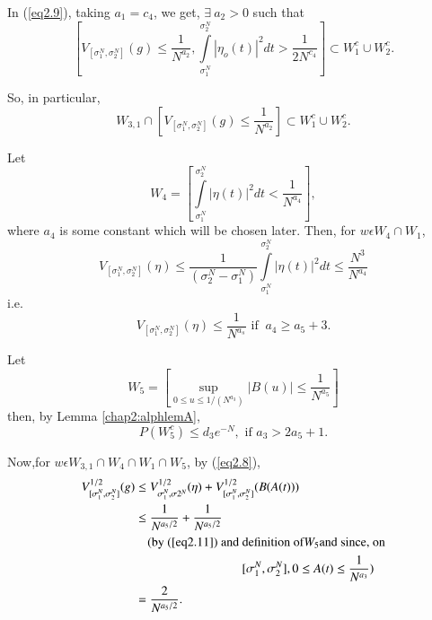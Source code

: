 In (\ref{eq2.9}), taking $a_1 = c_4$, we get, $\exists~ a_2  > 0$ such that  
$$
\left[V_{[\sigma_{1}^{N}, \sigma_{2}^{N}]} (g) \leq \frac{1}{N^{a_{2}}},
  \int\limits_{\sigma_{1}^{N}}^{\sigma_{2}^{N}} | \eta_o (t) |^2 dt >
  \frac{1}{2N^{c_{4}}}\right] \subset W_1^c  \cup W_2 ^c. 
$$

So, in particular,
\begin{equation*}
  W_{3, 1} \cap  \left[V _{[\sigma_{1}^{N}, \sigma_{2}^{N}]} (g) \leq
    \frac{1}{N^{a_{2}}}\right] \subset W_1^c \cup
  W_2^c. \tag{2.10}\label{eq2.10}  
\end{equation*}

Let
$$
 W_4 = \left[ \int\limits_{\sigma_{1}^{N}}^{\sigma_{2}^{N}} | \eta (t) |^2
   dt < \frac{1}{N^{a_{4}}} \right], 
$$
where $a_4$ is some  constant which will be chosen later. Then, for $w
\epsilon  W_4 \cap W_1$, 
$$
  V_{[\sigma_{1}^{N},\sigma_{2}^{N}]}(\eta) \leq
  \frac{1}{\left(\sigma_{2}^{N} -
    \sigma_{1}^{N}\right)} \int\limits_{\sigma_{1}^{N}}^{\sigma_{2}^{N}}|
  \eta (t) |^2 dt \leq \frac{N^3}{N^{a_{4}}} 
$$
i.e.
\begin{equation*}
 V_{[\sigma_{1}^{N},\sigma_{2}^{N}]}( \eta ) \leq \frac{1}{N^{a_{s}}}
 \text{ if }~ a_4 \geq a_5 + 3. \tag{2.11}\label{eq2.11}
\end{equation*}


Let
$$
W_5 = \left[\sup_{0 \leq u \leq  1/(N^{a_{3}})} | B (u) | \leq
  \frac{1}{N^{a_{5}}}\right] 
$$
then, by Lemma \ref{chap2:alphlemA},
\begin{equation*}
  P(W_5^c) \leq d_3 e^{-N}, \text{ if } a_3 > 2a_5 +
  1. \tag{2.12}\label{eq2.12} 
\end{equation*}
 
Now,\pageoriginale for $w \epsilon  W_{3, 1} \cap W_4 \cap W_1 \cap
W_5 $,  by (\ref{eq2.8}), 
\begin{align*}
  V_{[\sigma_{1}^{N},\sigma_{2}^{N}]}^{1/2} (g) & \leq
  V_{\sigma_{1}^{N},\sigma{2}^{N}}^{1/2}( \eta ) + V_{[\sigma_{1}^{N},
      \sigma_{2}^{N}]}^{1/2} (B (A(t)))\\ 
  &\leq \frac{1}{N^{a_{5}/2}} + \frac{1}{N^{a_{5}/2}}\\
  &\quad \text{(by (\ref{eq2.11}) and definition of} W_5 \text{and since, on}\\ 
  & \hspace{3cm}[\sigma_{1}^{N}, \sigma_{2}^{N}], 0 \leq A(t) \leq
  \frac{1}{N^{a_{3}}})\\ 
  &= \frac{2}{N^{a_{5}/2}}.
\end{align*}

